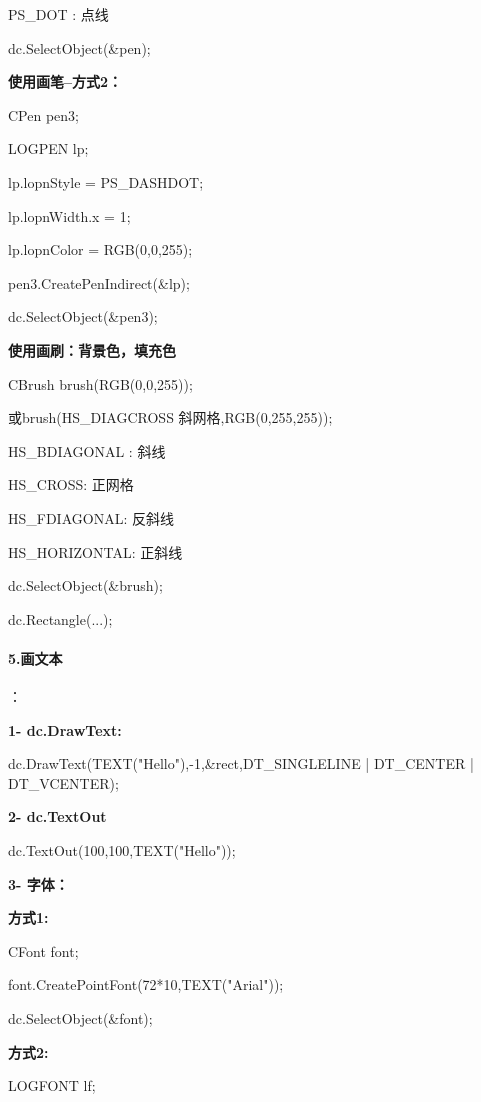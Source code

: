 \documentclass[UTF8,a4paper,8pt]{ctexart}
\begin{document}
		     PS\_DOT : 点线
		     
		     dc.SelectObject(\&pen);
	     
		\textbf{使用画笔--方式2：}
		     
		     CPen pen3;
		     
		     LOGPEN lp;
		     
		     lp.lopnStyle = PS\_DASHDOT;
		     
		     lp.lopnWidth.x = 1;
		     
		     lp.lopnColor = RGB(0,0,255);
		     
		     pen3.CreatePenIndirect(\&lp);
		     
		     dc.SelectObject(\&pen3);
		     
		\textbf{使用画刷：背景色，填充色}
		     
		     CBrush brush(RGB(0,0,255));
		     
		     或brush(HS\_DIAGCROSS 斜网格,RGB(0,255,255));
		     
		     HS\_BDIAGONAL : 斜线
		
		     HS\_CROSS: 正网格
		     
		     HS\_FDIAGONAL: 反斜线
		     
		     HS\_HORIZONTAL: 正斜线
		          
		     dc.SelectObject(\&brush);
		       
		     dc.Rectangle(...);
	     
	     \paragraph{5.画文本}：
	     
		     \textbf{1- dc.DrawText:}
		     
		     dc.DrawText(TEXT("Hello"),-1,\&rect,DT\_SINGLELINE | DT\_CENTER | DT\_VCENTER);
		     
		     \textbf{2- dc.TextOut}
		     
		     dc.TextOut(100,100,TEXT("Hello"));
		     
		     \textbf{3- 字体：}
		     
		     \textbf{方式1:}
		     
		     CFont font;
		     
		     font.CreatePointFont(72*10,TEXT("Arial"));
		     
		     dc.SelectObject(\&font);
		     
		     \textbf{方式2:}
		     
		     LOGFONT lf;
		     
\end{document}

